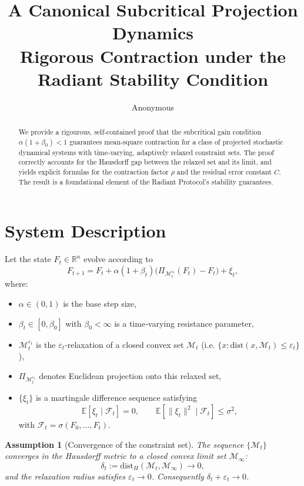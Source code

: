 \documentclass[11pt]{article}
\title{\textbf{A Canonical Subcritical Projection Dynamics}\\
\small Rigorous Contraction under the Radiant Stability Condition}
\author{Anonymous}
\date{}
\newtheorem{assumption}[theorem]{Assumption}
\begin{document}
\maketitle

\begin{abstract}
We provide a rigourous, self‑contained proof that the subcritical gain condition \(\alpha(1+\beta_0)<1\) guarantees mean‑square contraction for a class of projected stochastic dynamical systems with time‑varying, adaptively relaxed constraint sets. The proof correctly accounts for the Hausdorff gap between the relaxed set and its limit, and yields explicit formulas for the contraction factor \(\rho\) and the residual error constant \(C\). The result is a foundational element of the Radiant Protocol's stability guarantees.
\end{abstract}

\section{System Description}

Let the state \(F_t \in \mathbb{R}^n\) evolve according to
\begin{equation}\label{eq:main}
F_{t+1} = F_t + \alpha (1+\beta_t)\big(\Pi_{\mathcal{M}_t^{\varepsilon_t}}(F_t) - F_t\big) + \xi_t,
\end{equation}
where:
\begin{itemize}[nosep]
\item \(\alpha \in (0,1)\) is the base step size,
\item \(\beta_t \in [0,\beta_0]\) with \(\beta_0 < \infty\) is a time‑varying resistance parameter,
\item \(\mathcal{M}_t^{\varepsilon_t}\) is the \(\varepsilon_t\)-relaxation of a closed convex set \(\mathcal{M}_t\) (i.e. \(\{x : \mathrm{dist}(x,\mathcal{M}_t) \le \varepsilon_t\}\)),
\item \(\Pi_{\mathcal{M}_t^{\varepsilon_t}}\) denotes Euclidean projection onto this relaxed set,
\item \(\{\xi_t\}\) is a martingale difference sequence satisfying
\[
\mathbb{E}[\xi_t \mid \mathcal{F}_t] = 0, \qquad
\mathbb{E}[\|\xi_t\|^2 \mid \mathcal{F}_t] \le \sigma^2,
\]
with \(\mathcal{F}_t = \sigma(F_0,\dots,F_t)\).
\end{itemize}

\begin{assumption}[Convergence of the constraint set]\label{ass:conv}
The sequence \(\{\mathcal{M}_t\}\) converges in the Hausdorff metric to a closed convex limit set \(\mathcal{M}_\infty\):
\[
\delta_t := \mathrm{dist}_H(\mathcal{M}_t,\mathcal{M}_\infty) \to 0,
\]
and the relaxation radius satisfies \(\varepsilon_t \to 0\). Consequently \(\delta_t+\varepsilon_t \to 0\).
\end{assumption}
\end{document}
